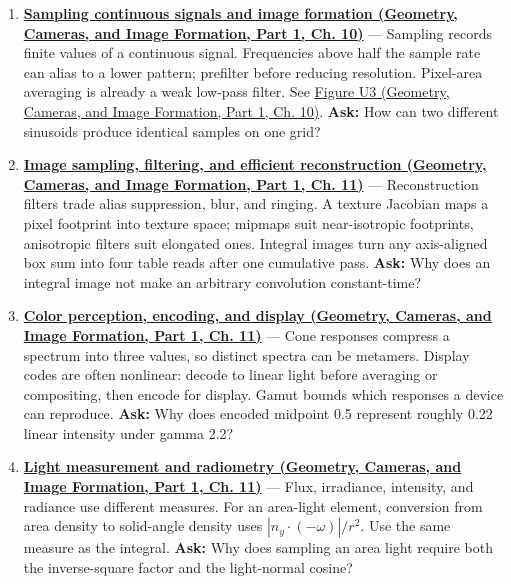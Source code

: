 \begin{enumerate}
\item
  \textbf{\href{../03-Geometry-Cameras-and-Image-Formation-P01/main.pdf\#03-visual-computing-i-ch003-sampling-continuous-signals-and-image-formation}{Sampling continuous signals and image formation (Geometry, Cameras, and Image Formation, Part 1, Ch. 10)}} --- Sampling records finite values of a continuous signal. Frequencies above half the sample rate can alias to a lower pattern; prefilter before reducing resolution. Pixel-area averaging is already a weak low-pass filter. See \href{../03-Geometry-Cameras-and-Image-Formation-P01/main.pdf\#03-visual-computing-i-ch003-figure-u3---two-signals-can-share-the-same-samples}{Figure U3 (Geometry, Cameras, and Image Formation, Part 1, Ch. 10)}. \textbf{Ask:} How can two different sinusoids produce identical samples on one grid?
\item
  \textbf{\href{../03-Geometry-Cameras-and-Image-Formation-P01/main.pdf\#03-visual-computing-i-ch004-image-sampling-filtering-and-efficient-reconstruction}{Image sampling, filtering, and efficient reconstruction (Geometry, Cameras, and Image Formation, Part 1, Ch. 11)}} --- Reconstruction filters trade alias suppression, blur, and ringing. A texture Jacobian maps a pixel footprint into texture space; mipmaps suit near-isotropic footprints, anisotropic filters suit elongated ones. Integral images turn any axis-aligned box sum into four table reads after one cumulative pass. \textbf{Ask:} Why does an integral image not make an arbitrary convolution constant-time?
\item
  \textbf{\href{../03-Geometry-Cameras-and-Image-Formation-P01/main.pdf\#03-visual-computing-i-ch004-color-perception-encoding-and-display}{Color perception, encoding, and display (Geometry, Cameras, and Image Formation, Part 1, Ch. 11)}} --- Cone responses compress a spectrum into three values, so distinct spectra can be metamers. Display codes are often nonlinear: decode to linear light before averaging or compositing, then encode for display. Gamut bounds which responses a device can reproduce. \textbf{Ask:} Why does encoded midpoint 0.5 represent roughly 0.22 linear intensity under gamma 2.2?
\item
  \textbf{\href{../03-Geometry-Cameras-and-Image-Formation-P01/main.pdf\#03-visual-computing-i-ch004-light-measurement-and-radiometry}{Light measurement and radiometry (Geometry, Cameras, and Image Formation, Part 1, Ch. 11)}} --- Flux, irradiance, intensity, and radiance use different measures. For an area-light element, conversion from area density to solid-angle density uses \(|n_y\cdot(-\omega)|/r^2\). Use the same measure as the integral. \textbf{Ask:} Why does sampling an area light require both the inverse-square factor and the light-normal cosine?

\end{enumerate}
